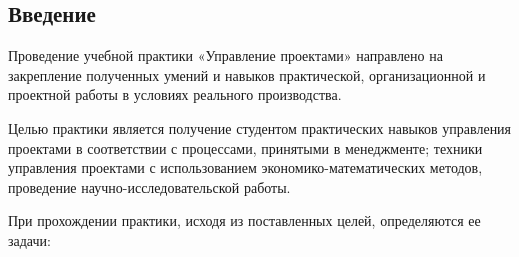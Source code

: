 \subsection*{Введение}

Проведение учебной практики «Управление проектами» направлено на закрепление полученных умений и навыков практической, организационной и проектной работы в условиях реального производства. 

Целью практики является получение студентом практических навыков управления проектами в соответствии с процессами, принятыми в менеджменте; техники управления проектами с использованием экономико-математических методов, проведение научно-исследовательской работы. 

При прохождении практики, исходя из поставленных целей, определяются ее задачи: 

